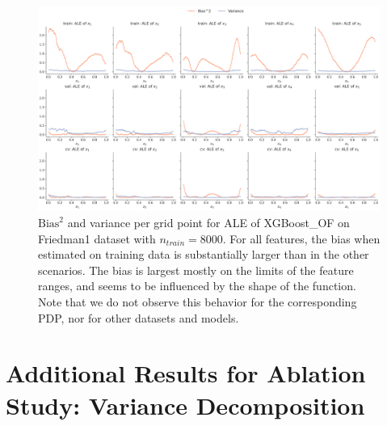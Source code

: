 \documentclass[runningheads]{llncs}
\begin{document}
\begin{figure}
    \centering
    \includegraphics[width=\textwidth]{img/further_investigation/friedman1_ale_XGBoost_OF_8000.png}
    \caption{$\text{Bias}^2$ and variance per grid point for ALE of XGBoost\_OF on Friedman1 dataset with $n_{train} = 8000$.
    For all features, the bias when estimated on training data is substantially larger than in the other scenarios. The bias
    is largest mostly on the limits of the feature ranges, and seems to be influenced by the shape of the function.
    Note that we do not observe this behavior for the corresponding PDP, nor for other datasets and models. 
    }
    \label{fig:further-ale-xgb-friedman}  %
\end{figure}

\clearpage
\section{Additional Results for Ablation Study: Variance Decomposition}\label{app:additional-variance-decomposition}
\end{document}
